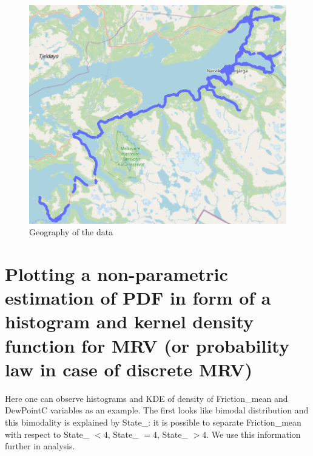 \documentclass[12pt, bachelor, substylefile = algo_title.rtx]{disser}
\theoremstyle{definition}
\begin{document}
\begin{figure}[!h]
\centering
   \begin{minipage}{0.7\textwidth}
     \includegraphics[width=\linewidth]{geography}
   \end{minipage}
\caption{Geography of the data}
\label{fig: }
\end{figure}

\section{Plotting a non-parametric estimation of PDF in form of a histogram and kernel
density function for MRV (or probability law in case of discrete MRV)}

Here one can observe histograms and KDE of density of Friction\_mean and DewPointC variables as an example. The first looks like bimodal distribution and this bimodality is explained by State\_: it is possible to separate Friction\_mean with respect to State\_ $<4$, State\_ $=4$, State\_ $>4$. We use this information further in analysis.
\end{document}
